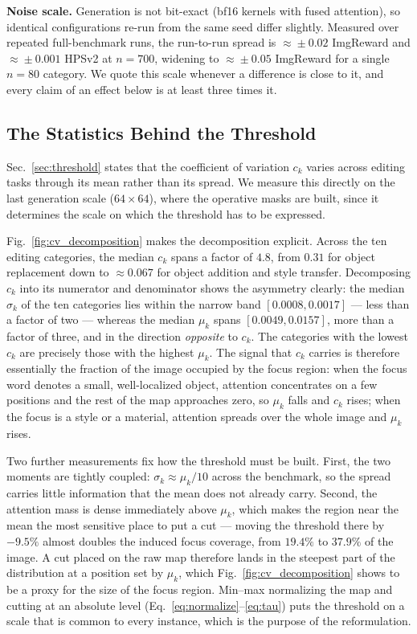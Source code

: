 \noindent\textbf{Noise scale.}
Generation is not bit-exact (bf16 kernels with fused attention), so identical
configurations re-run from the same seed differ slightly. Measured over repeated
full-benchmark runs, the run-to-run spread is $\approx\!\pm 0.02$ ImgReward and
$\approx\!\pm 0.001$ HPSv2 at $n{=}700$, widening to $\approx\!\pm 0.05$
ImgReward for a single $n{=}80$ category. We quote this scale whenever a
difference is close to it, and every claim of an effect below is at least three
times it.

\subsection{The Statistics Behind the Threshold}
\label{sec:cv_analysis}

Sec.~\ref{sec:threshold} states that the coefficient of variation $c_k$ varies
across editing tasks through its mean rather than its spread. We measure this
directly on the last generation scale ($64\times64$), where the operative masks
are built, since it determines the scale on which the threshold has to be
expressed.

Fig.~\ref{fig:cv_decomposition} makes the decomposition explicit.
Across the ten editing categories, the median $c_k$ spans a factor of $4.8$, from $0.31$ for object replacement down to $\approx\!0.067$ for object
addition and style transfer. Decomposing $c_k$ into its numerator and
denominator shows the asymmetry clearly: the median $\sigma_k$ of the ten
categories lies within the narrow band $[0.0008, 0.0017]$ --- less than a factor
of two --- whereas the median $\mu_k$ spans $[0.0049, 0.0157]$, more than a
factor of three, and in the direction \emph{opposite} to $c_k$. The categories
with the lowest $c_k$ are precisely those with the highest $\mu_k$. The signal
that $c_k$ carries is therefore essentially the fraction of the image occupied
by the focus region: when the focus word denotes a small, well-localized object,
attention concentrates on a few positions and the rest of the map approaches
zero, so $\mu_k$ falls and $c_k$ rises; when the focus is a style or a material,
attention spreads over the whole image and $\mu_k$ rises.

Two further measurements fix how the threshold must be built. First, the two
moments are tightly coupled: $\sigma_k \approx \mu_k/10$ across the benchmark, so
the spread carries little information that the mean does not already carry.
Second, the attention mass is dense immediately above $\mu_k$, which makes the
region near the mean the most sensitive place to put a cut --- moving the
threshold there by $-9.5\%$ almost doubles the induced focus coverage, from
$19.4\%$ to $37.9\%$ of the image. A cut placed on the raw map therefore lands in
the steepest part of the distribution at a position set by $\mu_k$, which
Fig.~\ref{fig:cv_decomposition} shows to be a proxy for the size of the focus
region. Min--max normalizing the map and cutting at an absolute level
(Eq.~\ref{eq:normalize}--\ref{eq:tau}) puts the threshold on a scale that is
common to every instance, which is the purpose of the reformulation.


